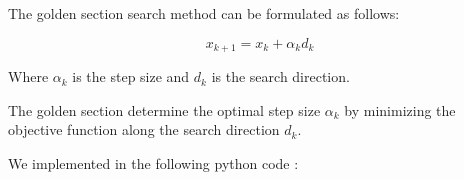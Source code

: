 \documentclass[12pt]{article}
\begin{document}
The golden section search method can be formulated as follows:

\begin{equation}
    x_{k+1} = x_k + \alpha_k d_k
\end{equation}
    
    Where $\alpha_k$ is the step size and $d_k$ is the search direction.


The golden section determine the optimal step size $\alpha_k$ by minimizing the objective function along the search direction $d_k$.


We implemented in the following python code :

\end{document}

